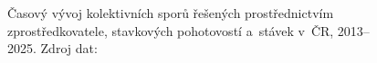 \def\strStavKolektivniSporyVyvojTitle{Kolektivní spory, stávkové pohotovosti a~stávky v~\acs{ČR}}%
\def\strStavKolektivniSporyVyvojYlabel{počet případů}%
\def\strStavKolektivniSporyVyvojCaption{Časový vývoj kolektivních sporů řešených prostřednictvím zprostředkovatele, stavkových pohotovostí a~stávek v~\acs{ČR}, 2013--2025. Zdroj dat: \cite{CMKOS_ZpravaKV2025}}%
%
\begin{figure}[htb]
  \centering
  \resizebox{\linewidth}{!}{}
  \caption{\strStavKolektivniSporyVyvojCaption}
  \label{fig:stav_kolektivni_spory_vyvoj}
\end{figure}
